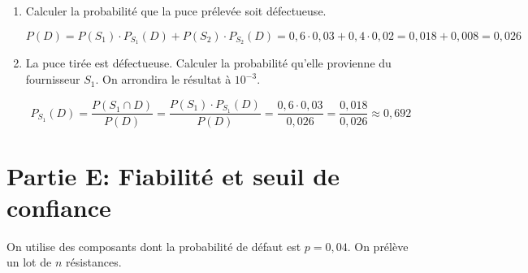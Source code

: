 \documentclass[11pt, a4paper]{report}
\begin{document}
\begin{enumerate}[resume]
\begin{minipage}{0.49\textwidth}
\begin{blocvisible}[height=5]
    \end{blocvisible}
\end{minipage}

\pagebreak
    \thispagestyle{DS_LP}

    \item Calculer la probabilité que la puce prélevée soit défectueuse.
    \begin{blocvisible}[height=1.5]
        \[P(D) = P(S_1) \cdot P_{S_1}(D) + P(S_2) \cdot P_{S_2}(D) = 0,6 \cdot 0,03 + 0,4 \cdot 0,02 = 0,018 + 0,008 = 0,026\]
    \end{blocvisible}
    \medskip
\item La puce tirée est défectueuse. Calculer la probabilité qu'elle provienne du fournisseur $S_1$. On arrondira le résultat à $10^{-3}$.
    \begin{blocvisible}[height=1.5]
        \[P_{S_1}(D) = \frac{P(S_1 \cap D)}{P(D)} = \frac{P(S_1) \cdot P_{S_1}(D)}{P(D)} = \frac{0,6 \cdot 0,03}{0,026} = \frac{0,018}{0,026} \approx 0,692\]
    \end{blocvisible}

\end{enumerate}



\section*{Partie E\@: Fiabilité et seuil de confiance}

On utilise des composants dont la probabilité de défaut est $p = 0,04$. On prélève un lot de $n$ résistances.

\medskip
\end{document}
